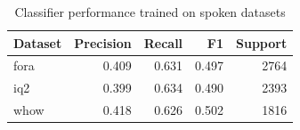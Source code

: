 \begin{table}[t]
\caption{Classifier performance trained on spoken datasets}
\label{tab:metrics_spoken}
\begin{tabular}{lrrrr}
\toprule
Dataset & Precision & Recall & F1 & Support \\
\midrule
fora & 0.409 & 0.631 & 0.497 & 2764 \\
iq2 & 0.399 & 0.634 & 0.490 & 2393 \\
whow & 0.418 & 0.626 & 0.502 & 1816 \\
\bottomrule
\end{tabular}
\end{table}
